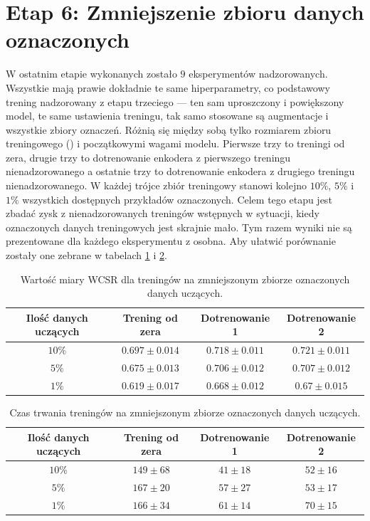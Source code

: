 \section{Etap 6: Zmniejszenie zbioru danych oznaczonych}

W ostatnim etapie wykonanych zostało $9$ eksperymentów nadzorowanych. Wszystkie mają prawie dokładnie te same hiperparametry, co podstawowy trening nadzorowany z etapu trzeciego --- ten sam uproszczony i powiększony model, te same ustawienia treningu, tak samo stosowane są augmentacje i wszystkie zbiory oznaczeń. Różnią się między sobą tylko rozmiarem zbioru treningowego () i początkowymi wagami modelu. Pierwsze trzy to treningi od zera, drugie trzy to dotrenowanie enkodera z pierwszego treningu nienadzorowanego a ostatnie trzy to dotrenowanie enkodera z drugiego treningu nienadzorowanego. W każdej trójce zbiór treningowy stanowi kolejno $10\%$, $5\%$ i $1\%$ wszystkich dostępnych przykładów oznaczonych. Celem tego etapu jest zbadać zysk z nienadzorowanych treningów wstępnych w sytuacji, kiedy oznaczonych danych treningowych jest skrajnie mało. Tym razem wyniki nie są prezentowane dla każdego eksperymentu z osobna. Aby ułatwić porównanie zostały one zebrane w tabelach \ref{tab:results_small-ds-wcsr} i \ref{tab:results_small-ds-epoch}.

\begin{table}
    \centering
    \caption{Wartość miary WCSR dla treningów na zmniejszonym zbiorze oznaczonych danych uczących.}
    \label{tab:results_small-ds-wcsr}
    \begin{tabular}{|c|c|c|c|}
        \hline Ilość danych uczących & Trening od zera & Dotrenowanie 1 & Dotrenowanie 2 \\ \hline
        $10\%$  & $0.697 \pm 0.014$ & $0.718 \pm 0.011$ & $0.721 \pm 0.011$ \\
        $5\%$   & $0.675 \pm 0.013$ & $0.706 \pm 0.012$ & $0.707 \pm 0.012$ \\
        $1\%$   & $0.619 \pm 0.017$ & $0.668 \pm 0.012$ & $0.67 \pm 0.015$ \\ \hline
    \end{tabular}
\end{table}

\begin{table}
    \centering
    \caption{Czas trwania treningów na zmniejszonym zbiorze oznaczonych danych uczących.}
    \label{tab:results_small-ds-epoch}
    \begin{tabular}{|c|c|c|c|}
        \hline Ilość danych uczących & Trening od zera & Dotrenowanie 1 & Dotrenowanie 2 \\ \hline
        $10\%$  & $149 \pm 68$ & $41 \pm 18$ & $52 \pm 16$ \\
        $5\%$   & $167 \pm 20$ & $57 \pm 27$ & $53 \pm 17$ \\
        $1\%$   & $166 \pm 34$ & $61 \pm 14$ & $70 \pm 15$ \\ \hline
    \end{tabular}
\end{table}

